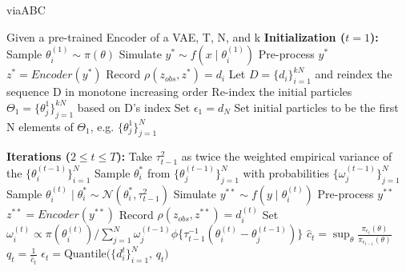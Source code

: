 \documentclass[12pt]{article} %
\begin{document}
\begin{algorithm}[H]
\caption{viaABC}
\begin{algorithmic}[1]
\State Given a pre-trained Encoder of a VAE, T, N, and k
\Statex \textbf{Initialization ($t=1$):}
    \State Sample $\theta^{(1)}_{i} \sim \pi(\theta)$
    \State Simulate $y^* \sim f(x \mid \theta^{(1)}_{i})$
    \State Pre-process $y^*$
    \State $z^* = Encoder(y^*)$
    \State Record $\rho(z_{obs}, z^*) = d_i$
\EndFor
\State Let $D =\{d_i\}_{i=1}^{kN}$ and reindex the sequence D in monotone increasing order
\State Re-index the initial particles $\Theta_1 = \{\theta^{1}_{j}\}_{j=1}^{kN}$ based on D's index
\State Set $\epsilon_1 = d_{N}$
\State Set initial particles to be the first N elements of $\Theta_1$, e.g. $\{\theta^{1}_{j}\}_{j=1}^{N}$

\Statex \textbf{Iterations ($2 \leqslant t \leqslant T$):}
    \State Take $\tau^{2}_{t-1}$ as twice the weighted empirical variance of the $\{\theta^{(t-1)}_{i}\}_{i=1}^N$
        \Repeat
            \State Sample $\theta^{*}_{i}$ from $\{\theta^{(t-1)}_{j}\}_{j=1}^{N}$ with probabilities $\{\omega^{(t-1)}_{j}\}_{j=1}^{N}$
            \State Sample $\theta^{(t)}_{i} \mid \theta^{*}_{i} \sim \mathcal{N}(\theta^{*}_{i}, \tau^{2}_{t-1})$
            \State Simulate $y^{**} \sim f(y \mid \theta^{(t)}_{i})$
            \State Pre-process $y^{**}$
            \State $z^{**} = Encoder(y^{**})$
        \State Record $\rho(z_{obs}, z^{**}) = d_i^{(t)}$
        \State Set $\omega^{(t)}_{i} \propto \pi(\theta^{(t)}_{i}) / \sum_{j=1}^{N} \omega^{(t-1)}_{j} \phi\{\tau^{-1}_{t-1}(\theta^{(t)}_{i} - \theta^{(t-1)}_{j})\}$
    \EndFor
    \State $\hat c_t = \sup_{\theta} \frac{\pi_{\epsilon_t}(\theta)}{\pi_{\epsilon_{t-1}}(\theta)}$
    \State $q_t = \frac{1}{\hat c_t}$
    \State $\epsilon_t = \text{Quantile($\{d_i^{t}\}_{i=1}^N$, $q_t$})$
\EndFor
\end{algorithmic}
\label{alg:viaABC}
\end{algorithm}



\newpage

\end{document}
